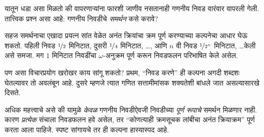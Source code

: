 \documentclass[../../../include/open-logic-section]{subfiles}
\begin{document}
यातून धडा असा मिळतो की वापरणाऱ्यांना फारशी जाणीव नसतानाही गणनीय निवड वारंवार वापरली गेली. तात्त्विक प्रश्न असा आहे: गणनीय निवडीचे \emph{समर्थन} कसे करावे?

सहज समर्थनाचा एखादा प्रयत्न सांत वेळेत अनंत क्रियांचा क्रम पूर्ण करण्याच्या कल्पनेचा आधार घेऊ शकतो. पहिली निवड $\nicefrac{1}{2}$ मिनिटात, दुसरी $\nicefrac{1}{4}$ मिनिटात, \dots, आणि $n$ वी निवड $\nicefrac{1}{2^n}$ मिनिटात, \dots\@ केली असे समजा. मग $1$ मिनिटात निवडींचा $\omega$-अनुक्रम पूर्ण करून निवडफलन परिभाषित केले असेल.

पण असा विचारप्रयोग खरोखर काय सांगू शकतो? प्रथम, “निवड करणे” ही कल्पना अगदी शब्दशः घेतल्यावर तो अवलंबून आहे. दुसरे म्हणजे त्यात गणित सत्तामीमांसक शक्यतेशी बांधले जात असल्यासारखे दिसते.

अधिक महत्त्वाचे असे की यामुळे \emph{केवळ} गणनीय निवडीऐवजी निवडीच्या \emph{पूर्ण रूपाचे} समर्थन मिळणार नाही. कारण \emph{प्रत्येक} संचाला निवडफलन हवे असेल, तर “कोणत्याही क्रमसूचक लांबीचा अनंत क्रियाक्रम” पूर्ण करता आला पाहिजे. स्पष्ट सांगायचे तर ही कल्पना हास्यास्पद आहे.
\end{document}

